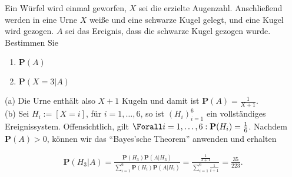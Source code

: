 
\begin{exercise}

Ein Würfel wird einmal geworfen, $X$ sei die erzielte Augenzahl. Anschließend werden in eine Urne $X$ weiße und eine schwarze Kugel gelegt, und eine Kugel wird gezogen. $A$ sei das Ereignis, dass die schwarze Kugel gezogen wurde. Bestimmen Sie

\begin{enumerate}[label = (\alph*)]

  \item
  $\mathbf{P}(A)$
  
  \item
  $\mathbf{P}(X = 3 | A)$

\end{enumerate}

\end{exercise}


\begin{solution}

(a) Die Urne enthält also $X + 1$ Kugeln und damit ist $\mathbf{P}(A) = \frac{1}{X + 1}$. \\

(b) Sei $H_i := [X = i]$, für $i = 1, \ldots, 6$, so ist $(H_i)_{i=1}^6$ ein vollständiges Ereignissystem. Offensichtlich, gilt $\Forall i = 1, \ldots, 6: \mathbf{P}(H_i) = \frac{1}{6}$. Nachdem $\mathbf{P}(A) > 0$, können wir das \enquote{Bayes'sche Theorem} anwenden und erhalten

\begin{align*}
  \mathbf{P}(H_3 | A)
  =
  \frac
  {\mathbf{P}(H_3) \mathbf{P}(A | H_3)}
  {\sum_{i=1}^6 \mathbf{P}(H_i) \mathbf{P}(A | H_i)}
  =
  \frac
  {\frac{1}{3+1}}
  {\sum_{i=1}^6 \frac{1}{i+1}}
  = \frac{35}{223}.
\end{align*}

\end{solution}

